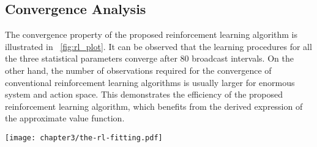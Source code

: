 \subsection{Convergence Analysis}
\label{subsec:chapter3-converge}
The convergence property of the proposed reinforcement learning algorithm is illustrated in \figurename~\ref{fig:rl_plot}.
It can be observed that the learning procedures for all the three statistical parameters converge after $80$ broadcast intervals.
On the other hand, the number of observations required for the convergence of conventional reinforcement learning algorithms is usually larger for enormous system and action space.
This demonstrates the efficiency of the proposed reinforcement learning algorithm, which benefits from the derived expression {of} the approximate value function.
\begin{figure*}[ht!]
    \centering
    \texttt{[image: chapter3/the-rl-fitting.pdf]}
    \caption{Illustration of reinforcement learning algorithm.} 
    \label{fig:rl_plot}
\end{figure*}

